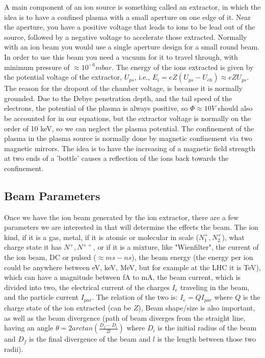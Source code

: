 A main component of an ion source is something called an extractor, in which the idea is to have a confined plasma with a small aperture on one edge of it.
Near the aperture, you have a positive voltage that leads to ions to be lead out of the source, followed by a negative voltage to accelerate those extracted.
Normally with an ion beam you would use a single aperture design for a small round beam.
In order to use this beam you need a vacuum for it to travel through, with minimum pressure of $\approx 10^{-6} mbar$.
The energy of the ions extracted is given by the potential voltage of the extractor, $U_{ps}$, i.e.,  $ E_i = eZ (U_{ps} - U_{ch}) \approx eZU_{ps}$.
The reason for the dropout of the chamber voltage, is because it is normally grounded.
Due to the Debye penetration depth, and the tail speed of the electrons, the potential of the plasma is always positive, so $\Phi \approx 10V$ should also be accounted for in our equations, but the extractor voltage is normally on the order of 10 keV, so we can neglect the plasma potential.
The confinement of the plasma in the plasma source is normally done by magnetic confinement via two magnetic mirrors.
The idea is to have the increasing of a magnetic field strength at two ends of a 'bottle' causes a reflection of the ions back towards the confinement.

\subsection{Beam Parameters}\label{subsec:beam-parameters}
Once we have the ion beam generated by the ion extractor, there are a few parameters we are interested in that will determine the effects the beam.
The ion kind, if it is a gas, metal, if it is atomic or molecular in scale ($N_1^+, N_2^+$), what charge state it has $N^+, N^{++}$,  or if it is a mixture, like "Wienfilter",
the current of the ion beam, DC or pulsed ($\approx ms - ns$),
the beam energy (the energy per ion could be anywhere between eV, keV, MeV, but for example at the LHC it is TeV), which can have a magnitude between fA to mA,
the beam current, which is divided into two, the electrical current of the charges $I_e$ traveling in the beam, and the particle current $I_{par}$.
The relation of the two is: $I_e = QI_{par}$ where $Q$ is the charge state of the ion extracted (can be $Z$),
Beam shape/size is also important, as well as the beam divergence (path of beam diverges from the straight line, having an angle $\theta = 2arctan(\frac{D_f - D_i}{2l})$ where $D_i$ is the initial radius of the beam and $D_f$ is the final divergence of the beam and $l$ is the length between those two radii).


